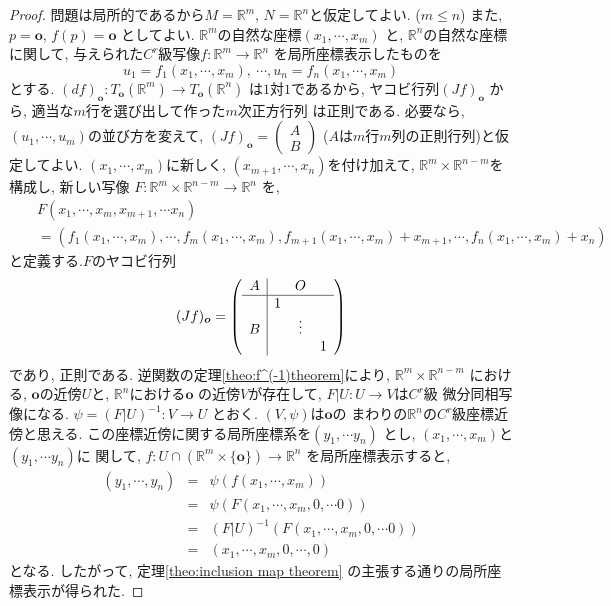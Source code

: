 \documentclass[a4j,12pt]{jarticle}
\theoremstyle{definition}
\begin{document}
\begin{proof}
    問題は局所的であるから$M=\mathbb{R}^m$, 
    $N=\mathbb{R}^n$と仮定してよい. ($m\leq n$)
    また, $p=\boldsymbol{o}$, $f(p)=\boldsymbol{o}$
    としてよい. 
    $\mathbb{R}^m$の自然な座標$(x_1, \cdots ,x_m)$
    と, $\mathbb{R}^n$の自然な座標に関して, 
    与えられた$C^r$級写像$f:\mathbb{R}^m\to \mathbb{R}^n$
    を局所座標表示したものを
    $$u_1=f_1(x_1,\cdots ,x_m),\ \cdots ,
    u_n=f_n(x_1,\cdots ,x_m)$$
    とする. $(df)_{\boldsymbol{o}}:
    T_{\boldsymbol{o}}(\mathbb{R}^m)\to 
    T_{\boldsymbol{o}}(\mathbb{R}^n)$
    は$1$対$1$であるから, ヤコビ行列$(Jf)_{\boldsymbol{o}}$
    から, 適当な$m$行を選び出して作った$m$次正方行列
    は正則である. 必要なら, 
    $(u_1, \cdots ,u_m)$の並び方を変えて, 
    $(Jf)_{\boldsymbol{o}}=
    \begin{pmatrix}
        A \\ \hline
        B
     \end{pmatrix}
     $
     ($A$は$m$行$m$列の正則行列)と仮定してよい. 
     $(x_1, \cdots ,x_m)$に新しく, 
     $(x_{m+1}, \cdots ,x_n)$を付け加えて, 
     $\mathbb{R}^m \times \mathbb{R}^{n-m}$を
     構成し, 新しい写像
     $F:\mathbb{R}^m \times \mathbb{R}^{n-m}
     \to \mathbb{R}^n$
    を, 
    \begin{eqnarray*}
        &&F(x_1,\cdots ,x_m,x_{m+1},\cdots x_n)\\
    &&=(f_1(x_1,\cdots ,x_m),\cdots ,f_m(x_1,\cdots ,x_m), 
    f_{m+1}(x_1,\cdots ,x_m)+x_{m+1}, 
    \cdots ,f_{n}(x_1,\cdots ,x_m)+x_{n})
    \end{eqnarray*}
    と定義する.$F$のヤコビ行列
    $$(Jf)_{\boldsymbol{o}}=
    \left(
\begin{array}{c|ccc} 
  A &  & O  &  \\ \hline
   & 1 &   &  \\
  B &  & \vdots &  \\
   &  &   & 1
\end{array} 
\right)
    $$
    であり, 正則である. 
    逆関数の定理\ref{theo:f^(-1)theorem}により, 
    $\mathbb{R}^m \times \mathbb{R}^{n-m}$
    における, $\boldsymbol{o}$の近傍$U$と, 
    $\mathbb{R}^n$における$\boldsymbol{o}$
    の近傍$V$が存在して, $F|U:U\to V$は$C^r$級
    微分同相写像になる. $\psi =(F|U)^{-1}:V\to U$
    とおく. $(V, \psi)$は$\boldsymbol{o}$の
    まわりの$\mathbb{R}^n$の$C^r$級座標近傍と思える. 
    この座標近傍に関する局所座標系を$(y_1,\cdots y_n)$
    とし, $(x_1, \cdots ,x_m)$と$(y_1,\cdots y_n)$に
    関して, $f:U\cap(\mathbb{R}^m\times 
    \{ \boldsymbol{o} \})\to \mathbb{R}^n$
    を局所座標表示すると, 
    \begin{eqnarray*}
        (y_1,\cdots ,y_n)&=&\psi (f(x_1,\cdots ,x_m))\\
        &=&\psi(F(x_1,\cdots ,x_m,0,\cdots 0))\\
        &=&(F|U)^{-1}(F(x_1,\cdots ,x_m,0,\cdots 0))\\
        &=&(x_1,\cdots ,x_m,0,\cdots ,0)
    \end{eqnarray*}
    となる. したがって, 定理\ref{theo:inclusion map theorem}
    の主張する通りの局所座標表示が得られた. 
\end{proof}
\end{document}
